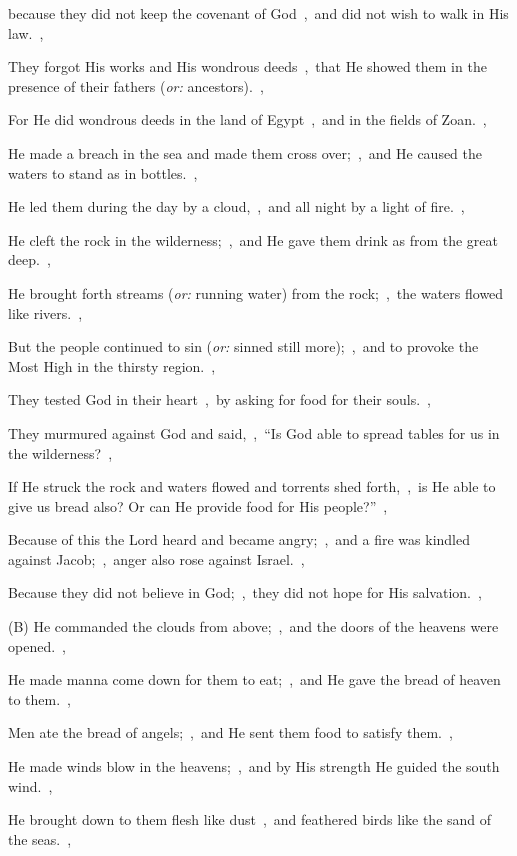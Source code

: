 \documentclass[12pt,twoside,a5paper]{article}
\newcommand{\translationoption}[1]{\emph{or:} #1}
\begin{document}
\begin{normalparskip}
  because they did not keep the covenant of God~\sep\ and did not wish to walk in His law.~\sep

  They forgot His works and His wondrous deeds~\sep\ that He showed them in the presence of their fathers (\translationoption{ancestors}).~\sep

  For He did wondrous deeds in the land of Egypt~\sep\ and in the fields of Zoan.~\sep

  He made a breach in the sea and made them cross over;~\sep\ and He caused the waters to stand as in bottles.~\sep

  He led them during the day by a cloud,~\sep\ and all night by a light of fire.~\sep

  He cleft the rock in the wilderness;~\sep\ and He gave them drink as from the great deep.~\sep

  He brought forth streams (\translationoption{running water}) from the rock;~\sep\ the waters flowed like rivers.~\sep

  But the people continued to sin (\translationoption{sinned still more});~\sep\ and to provoke the Most High in the thirsty region.~\sep

  They tested God in their heart~\sep\ by asking for food for their souls.~\sep

  They murmured against God and said,~\sep\ ``Is God able to spread tables for us in the wilderness?~\sep

  If He struck the rock and waters flowed and torrents shed forth,~\sep\ is He able to give us bread also? Or can He provide food for His people?''~\sep

  Because of this the Lord heard and became angry;~\sep\ and a fire was kindled against Jacob;~\sep\ anger also rose against Israel.~\sep

  Because they did not believe in God;~\sep\ they did not hope for His salvation.~\sep

  (B) He commanded the clouds from above;~\sep\ and the doors of the heavens were opened.~\sep

  He made manna come down for them to eat;~\sep\ and He gave the bread of heaven to them.~\sep

  Men ate the bread of angels;~\sep\ and He sent them food to satisfy them.~\sep

  He made winds blow in the heavens;~\sep\ and by His strength He guided the south wind.~\sep

  He brought down to them flesh like dust~\sep\ and feathered birds like the sand of the seas.~\sep


\end{normalparskip}
\end{document}
